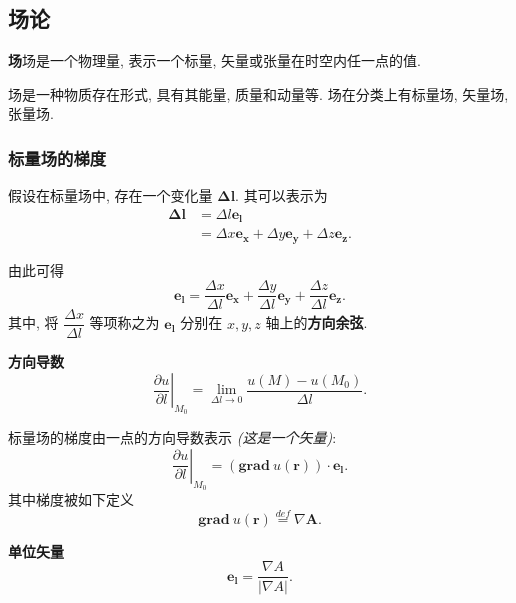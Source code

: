 \subsection{场论}

\textbf{场}\quad 场是一个物理量, 表示一个标量, 矢量或张量在时空内任一点的值.

场是一种物质存在形式, 具有其能量, 质量和动量等. 场在分类上有标量场, 矢量场, 张量场.

\subsubsection{标量场的梯度}
假设在标量场中, 存在一个变化量 $\bm{\Delta l}$. 其可以表示为
\begin{equation}
    \begin{aligned}
        \bm{\Delta l} & =\Delta l\bm{e_l}                                    \\
                      & =\Delta x\bm{e_x}+\Delta y\bm{e_y}+\Delta z\bm{e_z}.
    \end{aligned}
\end{equation}

由此可得
\begin{equation}
    \bm{e_l}=\frac{\Delta x}{\Delta l}\bm{e_x}+\frac{\Delta y}{\Delta l}\bm{e_y}+\frac{\Delta z}{\Delta l}\bm{e_z}.
\end{equation}
其中, 将 $\dfrac{\Delta x}{\Delta l}$ 等项称之为 $\bm{e_l}$ 分别在 $x,y,z$ 轴上的\textbf{方向余弦}.

\textbf{方向导数}
\begin{equation}
    \left.\frac{\partial u}{\partial l}\right|_{M_0}=\lim_{\Delta l\rightarrow 0}\frac{u(M)-u(M_0)}{\Delta l}.
\end{equation}

标量场的梯度由一点的方向导数表示 \textit{(这是一个矢量)}:
\begin{equation}
    \left.\frac{\partial u}{\partial l}\right|_{M_0}=(\textbf{grad}\ u(\bm{r}))\cdot\bm{e_l}.
\end{equation}
其中梯度被如下定义
\begin{equation}
    \textbf{grad}\ u(\bm{r})\stackrel{def}{=}\nabla\bm{A}.
\end{equation}

\textbf{单位矢量}
\begin{equation}
    \bm{e_l}=\frac{\nabla A}{|\nabla A|}.
\end{equation}


